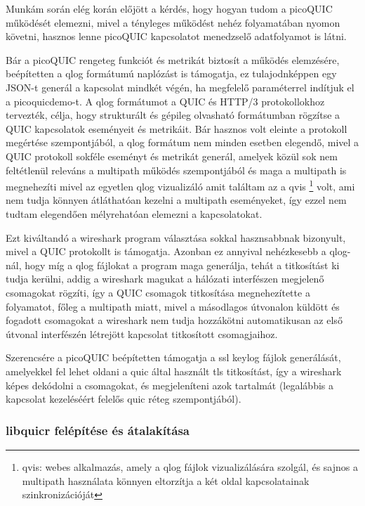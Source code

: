 \documentclass[a4paper,oneside]{article}
\begin{document}
Munkám során elég korán előjött a kérdés, hogy hogyan tudom a picoQUIC működését elemezni, mivel
a tényleges működést nehéz folyamatában nyomon követni, hasznos lenne picoQUIC kapcsolatot menedzselő adatfolyamot is látni.

Bár a picoQUIC rengeteg funkciót és metrikát biztosít a működés elemzésére, 
beépítetten a qlog formátumú naplózást is támogatja, ez tulajodnképpen egy JSON-t generál a kapcsolat mindkét végén, ha megfelelő paraméterrel indítjuk el a picoquicdemo-t.
A qlog formátumot a QUIC és HTTP/3 protokollokhoz tervezték, célja, hogy strukturált és gépileg olvasható formátumban rögzítse a QUIC kapcsolatok eseményeit és metrikáit.
Bár hasznos volt eleinte a protokoll megértése szempontjából, a qlog formátum nem minden esetben elegendő, mivel a QUIC protokoll
sokféle eseményt és metrikát generál, amelyek közül sok nem feltétlenül releváns a 
multipath működés szempontjából és maga a multipath is megnehezíti mivel az egyetlen 
qlog vizualizáló amit találtam az a qvis \footnote{qvis: webes alkalmazás, amely a qlog 
fájlok vizualizálására szolgál, és sajnos a multipath használata könnyen eltorzítja a két oldal 
kapcsolatainak szinkronizációját} volt, ami nem tudja könnyen átláthatóan kezelni a multipath eseményeket, 
így ezzel nem tudtam elegendően mélyrehatóan elemezni a kapcsolatokat.

Ezt kiváltandó a wireshark program választása sokkal hasznsabbnak bizonyult, mivel
a QUIC protokollt is támogatja. Azonban ez annyival nehézkesebb a qlog-nál, hogy míg a 
qlog fájlokat a program maga generálja, tehát a titkosítást ki tudja kerülni, addig a wireshark magukat a hálózati interfészen 
megjelenő csomagokat rögzíti, így a QUIC csomagok titkosítása megnehezítette a folyamatot, főleg a multipath miatt, mivel a
másodlagos útvonalon küldött és fogadott csomagokat a wireshark nem tudja hozzákötni automatikusan az első útvonal interfészén létrejött kapcsolat titkosított csomagjaihoz.

Szerencsére a picoQUIC beépítetten támogatja a ssl keylog fájlok generálását, amelyekkel fel lehet oldani a quic által használt tls titkosítást,
így a wireshark képes dekódolni a csomagokat, és megjeleníteni azok tartalmát (legalábbis a kapcsolat kezeléséért felelős quic réteg szempontjából).


\subsubsection{libquicr felépítése és átalakítása}
\end{document}
